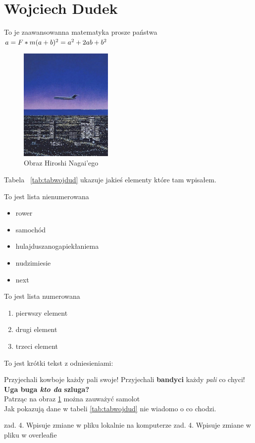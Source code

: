 \section{Wojciech Dudek}
\label{sec:wojdud}

To je zaawansowanna matematyka prosze państwa
\begin{math}
\\a = F*m
\\(a+b)^2 = a^2 + 2ab + b^2
\end{math}

\begin{figure}[htbp]
    \centering   
    \includegraphics[width=0.4\textwidth]{pictures/fotalatex.jpg}
    \caption{Obraz Hiroshi Nagai'ego}
    \label{fig:animuobrazek}
\end{figure}

Tabela ~\ref{tab:tabwojdud} ukazuje jakieś elementy które tam wpisałem.



To jest lista nienumerowana
\begin{itemize}
    \item rower
    \item samochód
    \item hulajduszanogapiekłaniema
    \item nudzimiesie
    \item next
\end{itemize}

To jest lista numerowana
\begin{enumerate}
    \item pierwszy element
    \item drugi element
    \item trzeci element
\end{enumerate}

To jest krótki tekst z odniesieniami:

Przyjechali kowboje każdy pali swoje!
Przyjechali \textbf{bandyci} każdy \textit{pali} co chyci!
\textbf{Uga buga \emph{kto da} szluga?}\\ 
Patrząc na obraz \ref{fig:animuobrazek} można zauważyć samolot\\
Jak pokazują dane w tabeli \ref{tab:tabwojdud} nie wiadomo o co chodzi.

zad. 4. Wpisuje zmiane w pliku lokalnie na komputerze
zad. 4. Wpisuje zmiane w pliku w overleafie
